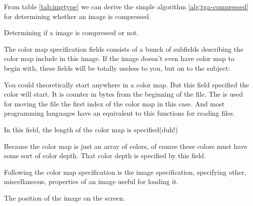 \begin{refsection}
  From table \ref{tab:imgtype} we can derive the simple algorithm
  \ref{alg:tga-compressed} for determining whether an image is
  compressed.

  \begin{algorithm}[H]
    \caption{Determining if a \tga image is compressed or not.}
    \label{alg:tga-compressed}
    \begin{algorithmic}[1]
    \end{algorithmic}
  \end{algorithm}


  The color map specification fields consists of a bunch of subfields
  describing the color map include in this image. If the image doesn't
  even have color map to begin with, these fields will be totally
  useless to you, but on to the subject:


  You could theoretically start anywhere in a color map. But this
  field specified the color will start. It is counter in bytes from
  the beginning of the file. The  is used for moving
  the file the first index of the color map in this case. And most
  programming languages have an equivalent to this functions for
  reading files.


  In this field, the length of the color map is specified(duh!)


  Because the color map is just an array of colors, of course these
  colors must have some sort of color depth. That color depth is
  specified by this field.


  Following the color map specification is the image specification,
  specifying other, miscellaneous, properties of an image useful for
  loading it.



  The position of the image on the screen.


\end{refsection}
